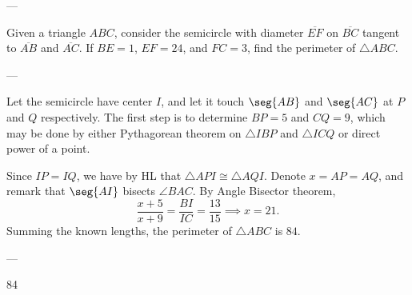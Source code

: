 
---

Given a triangle $ABC$, consider the semicircle with diameter $\overline{EF}$ on $\overline{BC}$ tangent to $\overline{AB}$ and $\overline{AC}$. If $BE=1$, $EF=24$, and $FC=3$, find the perimeter of $\triangle ABC$.

---

Let the semicircle have center $I$, and let it touch $\seg{AB}$ and $\seg{AC}$ at $P$ and $Q$ respectively. The first step is to determine $BP=5$ and $CQ=9$, which may be done by either Pythagorean theorem on $\triangle IBP$ and $\triangle ICQ$ or direct power of a point.

Since $IP=IQ$, we have by HL that $\triangle API\cong\triangle AQI$. Denote $x=AP=AQ$, and remark that $\seg{AI}$ bisects $\angle BAC$. By Angle Bisector theorem, \[\frac{x+5}{x+9}=\frac{BI}{IC}=\frac{13}{15}\implies x=21.\]
Summing the known lengths, the perimeter of $\triangle ABC$ is $84$.

---

84
